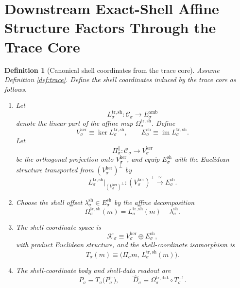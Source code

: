 \documentclass[11pt]{article}
\newcommand{\AmbientTarget}[1]{E_{#1}^{\mathrm{amb}}}
\newcommand{\CoreState}[1]{\mathcal C_{#1}}
\newcommand{\TraceBody}[1]{P_{#1}^{\mathrm{tr}}}
\newcommand{\TraceDataMap}[1]{\Omega_{#1}^{\mathrm{tr,dat}}}
\newcommand{\TraceShellMap}[1]{\Omega_{#1}^{\mathrm{tr,sh}}}
\newcommand{\TraceShellLin}[1]{L_{#1}^{\mathrm{tr,sh}}}
\newcommand{\ShellKer}[1]{V_{#1}^{\mathrm{ker}}}
\newcommand{\ShellNormal}[1]{E_{#1}^{\mathrm{sh}}}
\newcommand{\ShellOffset}[1]{\lambda_{#1}^{\mathrm{sh}}}
\newcommand{\DirProj}[1]{\Pi_{#1}^{\parallel}}
\newcommand{\CoordSpace}[1]{\mathcal K_{#1}}
\newcommand{\CoordBody}[1]{P_{#1}}
\newcommand{\CoordIso}[1]{T_{#1}}
\newcommand{\AffineData}[1]{\widehat D_{#1}}
\newtheorem{definition}{Definition}
\begin{document}
\section{Downstream Exact-Shell Affine Structure Factors Through the Trace Core}

\begin{definition}[Canonical shell coordinates from the trace core]
\label{def:shell}
Assume Definition \ref{def:trace}. Define the shell coordinates induced by the trace core as follows.
\begin{enumerate}
    \item Let
    \[
    \TraceShellLin{\sigma}:\CoreState{\sigma}\to\AmbientTarget{\sigma}
    \]
    denote the linear part of the affine map \(\TraceShellMap{\sigma}\). Define
    \[
    \ShellKer{\sigma}\equiv\ker\TraceShellLin{\sigma},
    \qquad
    \ShellNormal{\sigma}\equiv\operatorname{im}\TraceShellLin{\sigma}.
    \]
    Let
    \[
    \DirProj{\sigma}:\CoreState{\sigma}\to\ShellKer{\sigma}
    \]
    be the orthogonal projection onto \(\ShellKer{\sigma}\), and equip \(\ShellNormal{\sigma}\) with the Euclidean structure transported from \((\ShellKer{\sigma})^{\perp}\) by
    \[
    \TraceShellLin{\sigma}\big|_{(\ShellKer{\sigma})^{\perp}}
    :
    (\ShellKer{\sigma})^{\perp}\xrightarrow{\cong}\ShellNormal{\sigma}.
    \]
    \item Choose the shell offset \(\ShellOffset{\sigma}\in\ShellNormal{\sigma}\) by the affine decomposition
    \begin{equation}
    \TraceShellMap{\sigma}(m)
    =
    \TraceShellLin{\sigma}(m)-\ShellOffset{\sigma}.
    \label{eq:traceshelldecomp}
    \end{equation}
    \item The shell-coordinate space is
    \[
    \CoordSpace{\sigma}\equiv
    \ShellKer{\sigma}\oplus\ShellNormal{\sigma},
    \]
    with product Euclidean structure, and the shell-coordinate isomorphism is
    \begin{equation}
    \CoordIso{\sigma}(m)
    \equiv
    \bigl(
    \DirProj{\sigma}m,\,
    \TraceShellLin{\sigma}(m)
    \bigr).
    \label{eq:tracecoordiso}
    \end{equation}
    \item The shell-coordinate body and shell-data readout are
    \begin{equation}
    \CoordBody{\sigma}
    \equiv
    \CoordIso{\sigma}\bigl(\TraceBody{\sigma}\bigr),
    \qquad
    \AffineData{\sigma}
    \equiv
    \TraceDataMap{\sigma}\circ\CoordIso{\sigma}^{-1}.

\end{equation}
\end{enumerate}
\end{definition}
\end{document}
